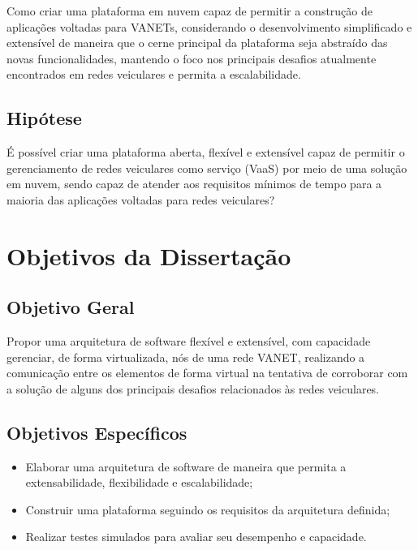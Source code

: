 \documentclass[
	12pt,				%
	oneside,			%
	a4paper,			%
	english,			%
	brazil				%
	]{abntex2ppgsi}
\begin{document}
Como criar uma plataforma em nuvem capaz de permitir a construção de aplicações voltadas para VANETs, considerando o desenvolvimento simplificado e extensível de maneira que o cerne principal da plataforma seja abstraído das novas funcionalidades, mantendo o foco nos principais desafios atualmente encontrados em redes veiculares e permita a escalabilidade. 

\subsection{Hipótese}

É possível criar uma plataforma aberta, flexível e extensível capaz de permitir o gerenciamento de redes veiculares como serviço (VaaS) por meio de uma solução em nuvem, sendo capaz de atender aos requisitos mínimos de tempo para a maioria das aplicações voltadas para redes veiculares?


\section{Objetivos da Dissertação}

\subsection{Objetivo Geral}
Propor uma arquitetura de software flexível e extensível, com capacidade gerenciar, de forma virtualizada, nós de uma rede VANET, realizando a comunicação entre os elementos de forma virtual na tentativa de corroborar com a solução de alguns dos principais desafios relacionados às redes veiculares.


\subsection{Objetivos Específicos}
\begin{itemize}
	\item{Elaborar uma arquitetura de software de maneira que permita a extensabilidade, flexibilidade e escalabilidade;}	
	\item{Construir uma plataforma seguindo os requisitos da arquitetura definida;}	
	\item{Realizar testes simulados para avaliar seu desempenho e capacidade.}	
\end{itemize} 
\end{document}
